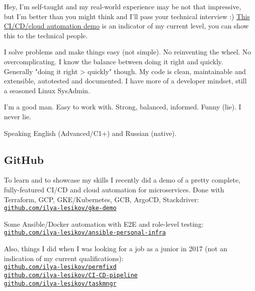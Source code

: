 \documentclass[11pt, a4paper]{article}
\newcommand{\Delimitline}{
  \vspace{-2ex}
  \noindent\makebox[\linewidth]{\rule{\DelimitlineLength}{0.12ex}} }
\newcommand\rurl[1]{%
  \-\hspace{0.5em}
  \href{http://#1}{\nolinkurl{#1}}%
}
\newcommand{\forceindent}{\leavevmode{\parindent=1em\indent}}
\begin{document}
\forceindent Hey, I'm self-taught and my real-world experience may be not that impressive, but I'm better than you might think and I'll pass your technical interview :) \href{https://github.com/ilya-lesikov/gke-demo}{This CI/CD/cloud automation demo} is an indicator of my current level, you can show this to the technical people.

\forceindent I solve problems and make things easy (not simple). No reinventing the wheel. No overcomplicating. I know the balance between doing it right and quickly. Generally "doing it right > quickly" though. My code is clean, maintainable and extensible, autotested and documented. I have more of a developer mindset, still a seasoned Linux SysAdmin.

\forceindent I'm a good man. Easy to work with. Strong, balanced, informed. Funny (lie). I never lie.

\forceindent Speaking English (Advanced/C1+) and Russian (native).


\subsection*{GitHub}
\Delimitline

\forceindent To learn and to showcase my skills I recently did a demo of a pretty complete, fully-featured CI/CD and cloud automation for microservices. Done with Terraform, GCP, GKE/Kubernetes, GCB, ArgoCD, Stackdriver:\vspace{0.2em}\\
\rurl{github.com/ilya-lesikov/gke-demo}

Some Ansible/Docker automation with E2E and role-level testing:\vspace{0.2em}\\
\rurl{github.com/ilya-lesikov/ansible-personal-infra}

Also, things I did when I was looking for a job as a junior in 2017 (not an indication of my current qualifications):\vspace{0.2em}\\
\rurl{github.com/ilya-lesikov/permfixd}\\
\rurl{github.com/ilya-lesikov/CI-CD-pipeline}\\
\rurl{github.com/ilya-lesikov/taskmngr}

\end{document}
